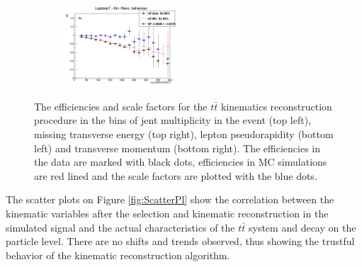 \begin{figure}[t]
\begin{subfigure}
\end{subfigure}
\begin{subfigure}
  \centering
  \includegraphics[width=0.49\textwidth]{05_kinReco/plots/eff_SF/KinRecoEff_LeptonpT.png}
\end{subfigure}
\caption{The efficiencies and scale factors for the $t\bar{t}$ kinematics reconstruction procedure in the bins of jent multiplicity in the event (top left),
         missing transverse energy (top right), lepton pseudorapidity (bottom left) and transverse momentum (bottom right). The efficiencies in the data 
         are marked with black dots, efficiencies in MC simulations are red lined and the scale factors are plotted with the blue dots.}
\label{fig:EffSF}
\end{figure}

The scatter plots on Figure \ref{fig:ScatterPl} show the correlation between the kinematic variables after the selection and kinematic reconstruction in the simulated
signal and the actual characteristics of the $t\bar{t}$ system and decay on the particle level. There are no shifts and trends observed, thus showing 
the trustful behavior of the kinematic reconstruction algorithm.

